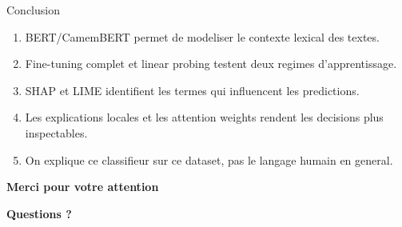 \documentclass[10pt]{beamer}
\begin{document}
\begin{frame}{Conclusion}
    \begin{tcolorbox}[colback=lightred!20, colframe=redforsnnu, title=Messages a retenir]
        \begin{enumerate}\small
            \item BERT/CamemBERT permet de modeliser le contexte lexical des textes.
            \item Fine-tuning complet et linear probing testent deux regimes d'apprentissage.
            \item SHAP et LIME identifient les termes qui influencent les predictions.
            \item Les explications locales et les attention weights rendent les decisions plus inspectables.
            \item On explique ce classifieur sur ce dataset, pas le langage humain en general.
        \end{enumerate}
    \end{tcolorbox}
\end{frame}

\begin{frame}[plain]
    \centering
    \vfill
    {\Large\textbf{Merci pour votre attention}\par}
    \vspace{0.8cm}
    {\Huge\textbf{Questions ?}\par}
    \vfill
\end{frame}
\end{document}
